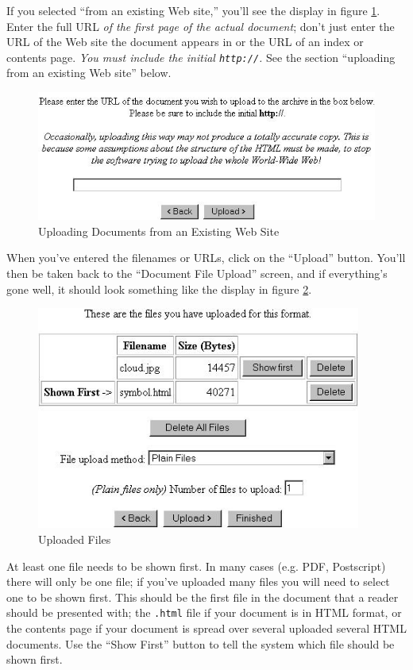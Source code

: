 If you selected ``from an existing Web site,'' you'll see the display in figure \ref{upload_web}. Enter the full URL \emph{of the first page of the actual document}; don't just enter the URL of the Web site the document appears in or the URL of an index or contents page. \emph{You must include the initial {\tt http://}.} See the section ``uploading from an existing Web site'' below.

\begin{figure}
\centerline{\includegraphics[width=4.8in]{images/upload-web}}
\caption{\label{upload_web} Uploading Documents from an Existing Web Site}
\end{figure}

When you've entered the filenames or URLs, click on the ``Upload'' button. You'll then be taken back to the ``Document File Upload'' screen, and if everything's gone well, it should look something like the display in figure \ref{uploaded_files}.

\begin{figure}
\centerline{\includegraphics[width=4.2in]{images/uploaded-files}}
\caption{\label{uploaded_files} Uploaded Files}
\end{figure}

At least one file needs to be shown first. In many cases (e.g. PDF, Postscript) there will only be one file; if you've uploaded many files you will need to select one to be shown first. This should be the first file in the document that a reader should be presented with; the {\tt .html} file if your document is in HTML format, or the contents page if your document is spread over several uploaded several HTML documents. Use the ``Show First'' button to tell the system which file should be shown first.

